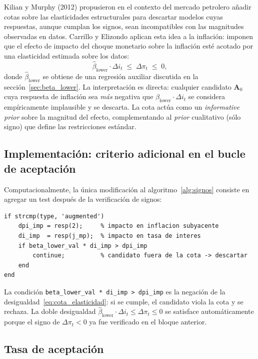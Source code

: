 \documentclass[11pt,letterpaper]{article}
\begin{document}
Kilian y Murphy (2012) propusieron en el contexto del mercado petrolero añadir cotas sobre las elasticidades estructurales para descartar modelos cuyas respuestas, aunque cumplan los signos, sean incompatibles con las magnitudes observadas en datos. Carrillo y Elizondo aplican esta idea a la inflación: imponen que el efecto de impacto del choque monetario sobre la inflación esté acotado por una elasticidad estimada sobre los datos:
\begin{equation}
\hat\beta_{\text{lower}} \cdot \Delta i_t \;\le\; \Delta \pi_t \;\le\; 0,
\label{eq:cota_elasticidad}
\end{equation}
donde $\hat\beta_{\text{lower}}$ se obtiene de una regresión auxiliar discutida en la sección~\ref{sec:beta_lower}. La interpretación es directa: cualquier candidato $\bm{A}_0$ cuya respuesta de inflación sea \textit{más} negativa que $\hat\beta_{\text{lower}} \cdot \Delta i_t$ se considera empíricamente implausible y se descarta. La cota actúa como un \textit{informative prior} sobre la magnitud del efecto, complementando al \textit{prior} cualitativo (sólo signo) que define las restricciones estándar.

\subsection{Implementación: criterio adicional en el bucle de aceptación}

Computacionalmente, la única modificación al algoritmo~\ref{alg:signos} consiste en agregar un test después de la verificación de signos:

\begin{lstlisting}[style=matlabstyle, caption={Filtro adicional de elasticidad para signos aumentados}]
if strcmp(type, 'augmented')
    dpi_imp = resp(2);     % impacto en inflacion subyacente
    di_imp  = resp(j_mp);  % impacto en tasa de interes
    if beta_lower_val * di_imp > dpi_imp
        continue;          % candidato fuera de la cota -> descartar
    end
end
\end{lstlisting}

La condición \texttt{beta\_lower\_val * di\_imp > dpi\_imp} es la negación de la desigualdad~\eqref{eq:cota_elasticidad}: si se cumple, el candidato viola la cota y se rechaza. La doble desigualdad $\hat\beta_{\text{lower}} \cdot \Delta i_t \le \Delta \pi_t \le 0$ se satisface automáticamente porque el signo de $\Delta \pi_t < 0$ ya fue verificado en el bloque anterior.

\subsection{Tasa de aceptación}
\end{document}

